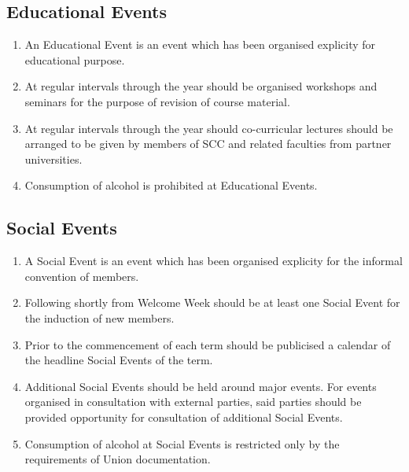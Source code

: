 \documentclass{scrartcl}
\begin{document}
        \subsection{Educational Events}
            \label{events--educational}
            \begin{enumerate}
                \item An Educational Event is an event which has been organised explicity for educational purpose.
                \item At regular intervals through the year should be organised workshops and seminars for the purpose of revision of course material.
                \item At regular intervals through the year should co-curricular lectures should be arranged to be given by members of SCC and related faculties from partner universities.
                \item Consumption of alcohol is prohibited at Educational Events.
            \end{enumerate}

        \subsection{Social Events}
            \label{events--social}
            \begin{enumerate}
                \item A Social Event is an event which has been organised explicity for the informal convention of members.
                \item Following shortly from Welcome Week should be at least one Social Event for the induction of new members.
                \item Prior to the commencement of each term should be publicised a calendar of the headline Social Events of the term.
                \item Additional Social Events should be held around major events.
                    \subitem For events organised in consultation with external parties, said parties should be provided opportunity for consultation of additional Social Events.
                \item Consumption of alcohol at Social Events is restricted only by the requirements of Union documentation.
            \end{enumerate}
\end{document}
